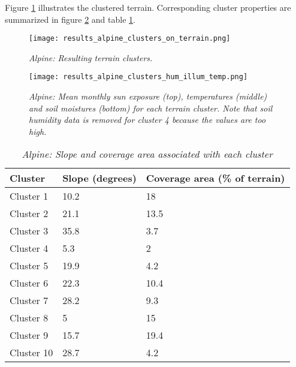 Figure \ref{fig:results_alpine_terrain_clusters} illustrates the clustered terrain. Corresponding cluster properties are summarized in figure \ref{fig:results_alpine_cluster_hum_temp_illum} and table \ref{tab:results_alpine_cluster_slope_covarea}. 

\begin{figure}[htb!]
\center
	\texttt{[image: results\_alpine\_clusters\_on\_terrain.png]}
	\caption{\textit{Alpine: Resulting terrain clusters.}}
	\label{fig:results_alpine_terrain_clusters}
\end{figure}

\begin{figure}[htb!]
\center
	\texttt{[image: results\_alpine\_clusters\_hum\_illum\_temp.png]}
	\caption{ \textit{Alpine: Mean monthly sun exposure (top), temperatures (middle) and soil moistures (bottom) for each terrain cluster. Note that soil humidity data is removed for cluster 4 because the values are too high.}}
	\label{fig:results_alpine_cluster_hum_temp_illum}
\end{figure}

\begin{table}[htb!]
  \centering
	    \begin{tabular}{|p{5cm}|p{5cm}|p{5cm}|}
		\hline	
  	    Cluster & \textbf{Slope (degrees)} & \textbf{Coverage area (\% of terrain)} \\
  	    \hline	
		Cluster 1 & 10.2 & 18 \\
		\hline
		Cluster 2 & 21.1 & 13.5 \\
		\hline
		Cluster 3 & 35.8 & 3.7 \\
		\hline
		Cluster 4 & 5.3 & 2 \\
		\hline
		Cluster 5 & 19.9 & 4.2 \\
		\hline
		Cluster 6 & 22.3 & 10.4 \\
		\hline
		Cluster 7 & 28.2 & 9.3 \\
		\hline
		Cluster 8 & 5 & 15 \\
		\hline
		Cluster 9 & 15.7 & 19.4 \\
		\hline
		Cluster 10 & 28.7 & 4.2 \\
		\hline
		\end{tabular}
		\caption{\textit{Alpine: Slope and coverage area associated with each cluster}}
	  \label{tab:results_alpine_cluster_slope_covarea}
\end{table}

